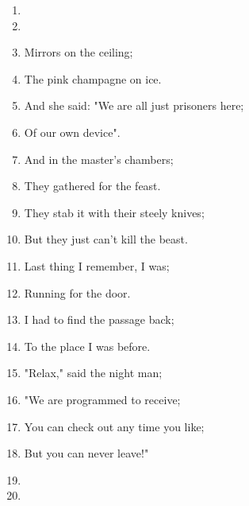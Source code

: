 \documentclass{article}
\begin{document}
\begin{center}
\begin{enumerate}
            \item[]
            \item[] 
            \item Mirrors on the ceiling;
            \item The pink champagne on ice.
            \item And she said: "We are all just prisoners here;
            \item Of our own device".
            \item And in the master's chambers;
            \item They gathered for the feast.
            \item They stab it with their steely knives;
            \item But they just can't kill the beast.
            \item Last thing I remember, I was;
            \item Running for the door.
            \item I had to find the passage back;
            \item To the place I was before.
            \item "Relax," said the night man;
            \item "We are programmed to receive;
            \item You can check out any time you like;
            \item But you can never leave!"

            \item []
            \item \instrumental

        \end{enumerate}
    \end{center}
\end{document}
